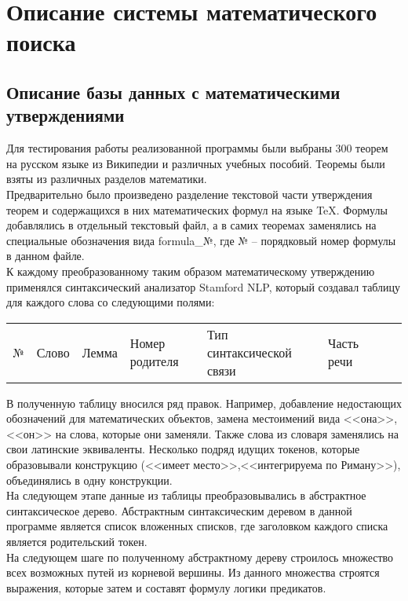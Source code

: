 \documentclass[12pt]{article}
\begin{document}
\newpage
\section{Описание системы математического поиска}
\subsection{Описание базы данных с математическими утверждениями}
Для тестирования работы реализованной программы были выбраны 300 теорем на русском языке из Википедии и различных учебных пособий. Теоремы были взяты из различных разделов математики. \\

Предварительно было произведено разделение текстовой части утверждения теорем и содержащихся в них математических формул на языке TeX. Формулы добавлялись в отдельный текстовый файл, а в самих теоремах заменялись на специальные обозначения вида formula\_№, где № --  порядковый номер формулы в данном файле.\\

К каждому преобразованному таким образом математическому утверждению применялся синтаксический анализатор Stamford NLP, который создавал таблицу для каждого слова со следующими полями:

\begin{table}[h!]
\begin{tabular}{ l l l l l l l l }
№ & Слово & Лемма & Номер родителя & Тип синтаксической связи & Часть речи \\
\end{tabular}
\end{table} 

В полученную таблицу вносился ряд правок. Например, добавление недостающих обозначений для математических объектов, замена местоимений вида <<она>>,<<он>> на слова, которые они заменяли. Также слова из словаря заменялись на свои латинские эквиваленты. Несколько подряд идущих токенов, которые образовывали конструкцию (<<имеет место>>,<<интегрируема по Риману>>), объединялись в одну конструкции.\\

На следующем этапе данные из таблицы преобразовывались в абстрактное синтаксическое дерево. Абстрактным синтаксическим деревом в данной программе является список вложенных списков, где заголовком каждого списка является родительский токен. \\

На следующем шаге по полученному абстрактному дереву строилось множество всех возможных путей из корневой вершины. Из данного множества строятся выражения, которые затем и составят формулу логики предикатов. \\
\end{document}
